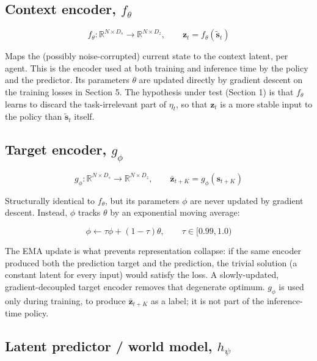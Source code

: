 \documentclass[11pt]{article}
\begin{document}
\hypertarget{context-encoder-f_theta}{%
\subsection{\texorpdfstring{Context encoder, \(f_\theta\)}{Context encoder, f theta}}\label{context-encoder-f_theta}}

\[f_\theta: \mathbb{R}^{N \times D_s} \rightarrow \mathbb{R}^{N \times D_z}, \qquad \mathbf{z}_t = f_\theta(\tilde{\mathbf{s}}_t)\]

Maps the (possibly noise-corrupted) current state to the context latent, per agent. This is the encoder used at both training and inference time by the policy and the predictor. Its parameters \(\theta\) are updated directly by gradient descent on the training losses in Section 5. The hypothesis under test (Section 1) is that \(f_\theta\) learns to discard the task-irrelevant part of \(\eta_t\), so that \(\mathbf{z}_t\) is a more stable input to the policy than \(\tilde{\mathbf{s}}_t\) itself.

\hypertarget{target-encoder-g_phi}{%
\subsection{\texorpdfstring{Target encoder, \(g_\phi\)}{Target encoder, g phi}}\label{target-encoder-g_phi}}

\[g_\phi: \mathbb{R}^{N \times D_s} \rightarrow \mathbb{R}^{N \times D_z}, \qquad \bar{\mathbf{z}}_{t+K} = g_\phi(\mathbf{s}_{t+K})\]

Structurally identical to \(f_\theta\), but its parameters \(\phi\) are never updated by gradient descent. Instead, \(\phi\) tracks \(\theta\) by an exponential moving average:

\[\phi \leftarrow \tau \phi + (1-\tau)\theta, \qquad \tau \in [0.99, 1.0)\]

The EMA update is what prevents representation collapse: if the same encoder produced both the prediction target and the prediction, the trivial solution (a constant latent for every input) would satisfy the loss. A slowly-updated, gradient-decoupled target encoder removes that degenerate optimum. \(g_\phi\) is used only during training, to produce \(\bar{\mathbf{z}}_{t+K}\) as a label; it is not part of the inference-time policy.

\hypertarget{latent-predictor-world-model-h_psi}{%
\subsection{\texorpdfstring{Latent predictor / world model, \(h_\psi\)}{Latent predictor / world model, h psi}}\label{latent-predictor-world-model-h_psi}}
\end{document}
